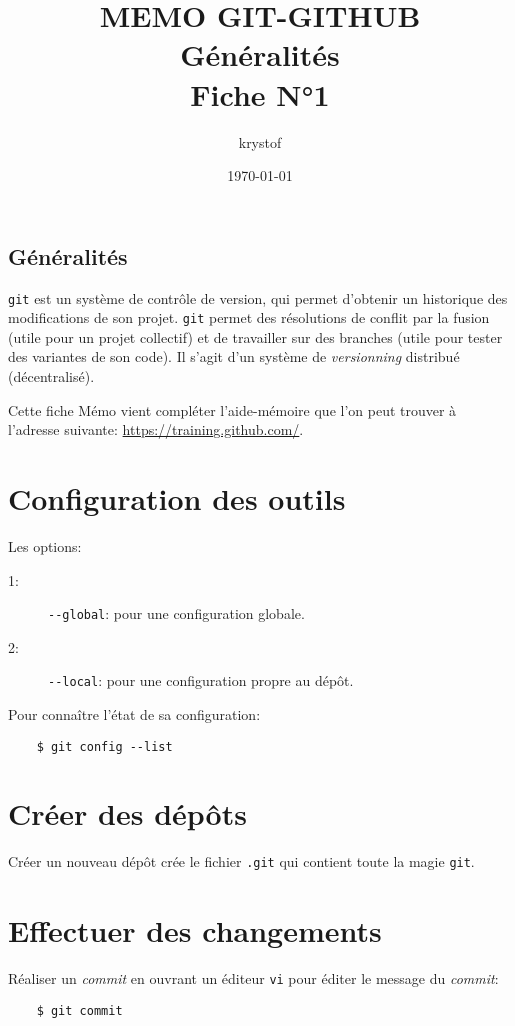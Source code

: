 \documentclass[a4paper,11pt,french]{article}
\title{MEMO GIT-GITHUB \\
 Généralités \\
 Fiche N°1}
\author{krystof}
\date{\today}
\begin{document}
\maketitle
\begin{center}
	\section*{{\color{red}Généralités}}
\end{center}
\medskip

\verb|git| est un système de contrôle de version, qui permet d'obtenir un historique des modifications de son projet. \verb|git| permet des résolutions de conflit par la fusion (utile pour un projet collectif) et de travailler sur des branches (utile pour tester des variantes de son code). Il s'agit d'un système de \textit{versionning} distribué (décentralisé).
\medskip

Cette fiche \og Mémo \fg{} vient compléter l'aide-mémoire que l'on peut trouver à l'adresse suivante: \url{https://training.github.com/}.
\medskip

\section{Configuration des outils}
Les options:
\begin{description}
	\item[1: ] \verb|--global|: pour une configuration globale.
	\item[2: ] \verb|--local|: pour une configuration propre au dépôt.
\end{description}
\medskip

Pour connaître l'état de sa configuration:
\begin{verbatim}
    $ git config --list
\end{verbatim}
\medskip

\section{Créer des dépôts}
Créer un nouveau dépôt crée le fichier \verb|.git| qui contient toute la \og magie \fg{} \verb|git|.
\medskip

\section{Effectuer des changements}
Réaliser un \textit{commit} en ouvrant un éditeur \verb|vi| pour éditer le message du \textit{commit}:
\begin{verbatim}
    $ git commit
\end{verbatim}
\medskip
\end{document}
